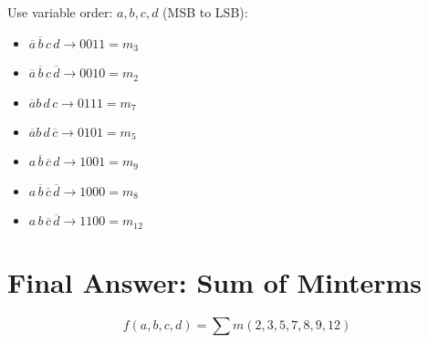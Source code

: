 \documentclass[12pt]{article}
\begin{document}
Use variable order: $a, b, c, d$ (MSB to LSB):

\begin{itemize}
    \item $\overline{a}\,\overline{b}\,c\,d \rightarrow 0011 = m_3$
    \item $\overline{a}\,\overline{b}\,c\,\overline{d} \rightarrow 0010 = m_2$
    \item $\overline{a}b\,d\,c \rightarrow 0111 = m_7$
    \item $\overline{a}b\,d\,\overline{c} \rightarrow 0101 = m_5$
    \item $a\,\overline{b}\,\overline{c}\,d \rightarrow 1001 = m_9$
    \item $a\,\overline{b}\,\overline{c}\,\overline{d} \rightarrow 1000 = m_8$
    \item $a\,b\,\overline{c}\,\overline{d} \rightarrow 1100 = m_{12}$
\end{itemize}

\section*{Final Answer: Sum of Minterms}

\[
\boxed{f(a,b,c,d) = \sum m(2, 3, 5, 7, 8, 9, 12)}
\]
\end{document}
